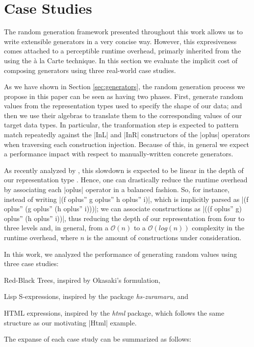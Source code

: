 \section{Case Studies}
\label{sec:casestudies}

The random generation framework presented throughout this work allows us to
write extensible generators in a very concise way.
%
However, this expresiveness comes attached to a perceptible runtime overhead,
primarly inherited from the using the \`a la Carte technique.
%
In this section we evaluate the implicit cost of composing generators using
three real-world case studies.


As we have shown in Section \ref{sec:generators}, the random generation
process we propose in this paper can be seen as having two phases.
%
First, generate random values from the representation types used to specify the
shape of our data; and then we use their algebras to translate them to the
corresponding values of our target data types.
%
In particular, the tranformation step is expected to pattern match repeatedly
against the |InL| and |InR| constructors of the |oplus| operators when
traversing each construction injection.
%
Because of this, in general we expect a performance impact with respect to
manually-written concrete generators.


As recently analyzed by \citeauthor{KiriyamaOptimizingDTC}, this slowdown is
expected to be linear in the depth of our representation type
\cite{KiriyamaOptimizingDTC}.
%
Hence, one can drastically reduce the runtime overhead by associating each
|oplus| operator in a balanced fashion.
%
So, for instance, instead of writing |(f oplus'' g oplus'' h oplus'' i)|, which
is implicitly parsed as |(f oplus'' (g oplus'' (h oplus'' i)))|; we can
associate constructions as |((f oplus'' g) oplus'' (h oplus'' i))|, thus
reducing the depth of our representation from four to three levels and, in
general, from a $\mathcal{O}(n)$ to a $\mathcal{O}(log(n))$ complexity in the
runtime overhead, where $n$ is the amount of constructions under consideration.



In this work, we analyzed the performance of generating random values using
three case studies:
%
\begin{inparaenum}[(i)]
\item Red-Black Trees, inspired by Okasaki's formulation,
\item Lisp S-expressions, inspired by the package \emph{hs-zuramaru}, and
\item HTML expressions, inspired by the \emph{html} package, which follows the
  same structure as our motivating |Html| example.
\end{inparaenum}
%
The expanse of each case study can be summarized as follows:

